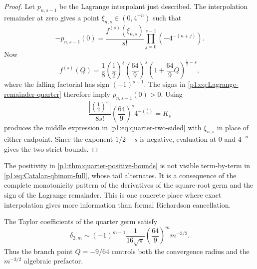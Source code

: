 \documentclass[11pt,oneside]{article}
\numberwithin{equation}{section}
\theoremstyle{definition}
\theoremstyle{remark}
\begin{document}
\begin{proof}
Let $p_{n,s-1}$ be the Lagrange interpolant just described.  The interpolation
remainder at zero gives a point $\xi_{n,s}\in(0,4^{-n})$ such that
\begin{equation}
 -p_{n,s-1}(0)
 =\frac{f^{(s)}(\xi_{n,s})}{s!}
   \prod_{j=0}^{s-1}(-4^{-(n+j)}).
 \label{p1:eq:Lagrange-remainder-quarter}
\end{equation}
Now
\begin{equation}
 f^{(s)}(Q)=\frac1{8}\left(\frac12\right)^{\!\underline{s}}
 \left(\frac{64}{9}\right)^s
 \left(1+\frac{64}{9}Q\right)^{\frac12-s},
 \label{p1:eq:f-quarter-derivative}
\end{equation}
where the falling factorial has sign $(-1)^{s-1}$.  The signs in
\eqref{p1:eq:Lagrange-remainder-quarter} therefore imply $p_{n,s-1}(0)>0$.
Using
\begin{equation}
 \frac{\left|\left(\frac12\right)^{\!\underline{s}}\right|}{8s!}
 \left(\frac{64}{9}\right)^s4^{-\binom s2}=K_s
 \label{p1:eq:Ks-identity}
\end{equation}
produces the middle expression in \eqref{p1:eq:quarter-two-sided} with
$\xi_{n,s}$ in place of either endpoint.  Since the exponent $1/2-s$ is
negative, evaluation at $0$ and $4^{-n}$ gives the two strict bounds.
\end{proof}

\begin{remark}
The positivity in \cref{p1:thm:quarter-positive-bounds} is not visible term-by-term in
\eqref{p1:eq:Catalan-qbinom-full}, whose tail alternates.  It is a consequence of the
complete monotonicity pattern of the derivatives of the square-root germ and the sign
of the Lagrange remainder.  This is one concrete place where exact interpolation gives
more information than formal Richardson cancellation.
\end{remark}

\begin{proposition}
\label{p1:prop:Catalan-large-order}
The Taylor coefficients of the quarter germ satisfy
\begin{equation}
 \boxed{
 \delta_{2,m}\sim
 (-1)^{m-1}\frac1{16\sqrt\pi}\left(\frac{64}{9}\right)^m m^{-3/2}.}
 \label{p1:eq:Catalan-large-order}
\end{equation}
Thus the branch point $Q=-9/64$ controls both the convergence radius and the
$m^{-3/2}$ algebraic prefactor.
\end{proposition}
\end{document}
